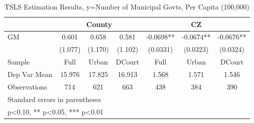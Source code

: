 \begin{table}[htbp]\centering
\def\sym#1{\ifmmode^{#1}\else\(^{#1}\)\fi}
\caption{TSLS Estimation Results, y=Number of Municipal Govts, Per Capita (100,000)}
\begin{tabular}{l*{6}{c}}
\toprule
                &\multicolumn{3}{c}{County}            &\multicolumn{3}{c}{CZ}                \\\cmidrule(lr){2-4}\cmidrule(lr){5-7}
\midrule
GM              &    0.601   &    0.658   &    0.581   &  -0.0698** &  -0.0674** &  -0.0676** \\
                &  (1.077)   &  (1.170)   &  (1.102)   & (0.0331)   & (0.0323)   & (0.0324)   \\
\midrule
Sample          &     Full   &    Urban   &   DCourt   &     Full   &    Urban   &   DCourt   \\
Dep Var Mean    &   15.976   &   17.825   &   16.913   &    1.568   &    1.571   &    1.546   \\
Observations    &      714   &      621   &      663   &      438   &      384   &      390   \\
\bottomrule
\multicolumn{7}{l}{\footnotesize Standard errors in parentheses}\\
\multicolumn{7}{l}{\footnotesize * p<0.10, ** p<0.05, *** p<0.01}\\
\end{tabular}
\end{table}
